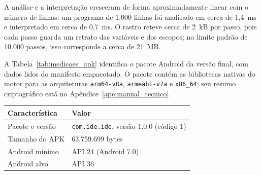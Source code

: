 A análise e a interpretação cresceram de forma aproximadamente linear com o
número de linhas: um programa de 1.000 linhas foi analisado em cerca de 1,4~ms e
interpretado em cerca de 0,7~ms. O rastro reteve cerca de 2~kB por passo, pois
cada passo guarda um retrato das variáveis e dos escopos; no limite padrão de
10.000 passos, isso corresponde a cerca de 21~MB.

A Tabela~\ref{tab:medicoes_apk} identifica o pacote Android da versão final, com
dados lidos do manifesto empacotado. O pacote contém as bibliotecas nativas do
motor para as arquiteturas \texttt{arm64-v8a}, \texttt{armeabi-v7a} e
\texttt{x86\_64}; seu resumo criptográfico está no
Apêndice~\ref{ape:manual_tecnico}.

\begin{table}[htb]
\centering
{}
\footnotesize
\begin{tabular}{P{4.2cm}P{8.4cm}}
\toprule
Característica & Valor \\
\midrule
Pacote e versão & \texttt{com.ide.ide}, versão 1.0.0 (código 1) \\
Tamanho do APK & 63.759.699 bytes \\
Android mínimo & API 24 (Android 7.0) \\
Android alvo & API 36 \\
\bottomrule
\end{tabular}
\vspace{0.2cm}
\fonteautor
\end{table}
\FloatBarrier
